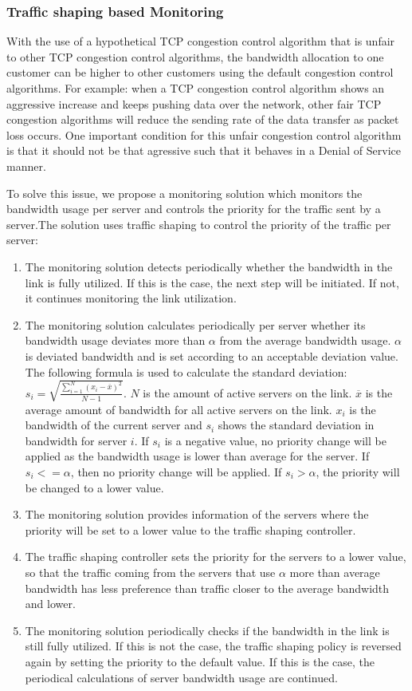 \documentclass{article}
\begin{document}
\subsubsection{Traffic shaping based Monitoring}
With the use of a hypothetical TCP congestion control algorithm that is unfair to other TCP congestion control algorithms, the bandwidth allocation to one customer can be higher to other customers using the default congestion control algorithms. For example: when a TCP congestion control algorithm shows an aggressive increase and keeps pushing data over the network, other fair TCP congestion algorithms will reduce the sending rate of the data transfer as packet loss occurs. One important condition for this unfair congestion control algorithm is that it should not be that agressive such that it behaves in a Denial of Service manner.

To solve this issue, we propose a monitoring solution which monitors the bandwidth usage per server and controls the priority for the traffic sent by a server.The solution uses traffic shaping to control the priority of the traffic per server:
\begin{enumerate}
	\item The monitoring solution detects periodically whether the bandwidth in the link is fully utilized. If this is the case, the next step will be initiated. If not, it continues monitoring the link utilization.
	\item The monitoring solution calculates periodically per server whether its bandwidth usage deviates more than $\alpha$ from the average bandwidth usage. $\alpha$ is deviated bandwidth and is set according to an acceptable deviation value. The following formula is used to calculate the standard deviation: $s_{i} = \sqrt{\frac{\sum_{i=1}^N (x_i - \overline{x})^2}{N-1} }$. $N$ is the amount of active servers on the link. $\overline{x}$ is the average amount of bandwidth for all active servers on the link. $x_i$ is the bandwidth of the current server and $s_{i}$ shows the standard deviation in bandwidth for server $i$. If $s_{i}$ is a negative value, no priority change will be applied as the bandwidth usage is lower than average for the server. If $s_{i} <= \alpha$, then no priority change will be applied. If $s_{i} > \alpha$, the priority will be changed to a lower value.
	\item The monitoring solution provides information of the servers where the priority will be set to a lower value to the traffic shaping controller.
	\item The traffic shaping controller sets the priority for the servers to a lower value, so that the traffic coming from the servers that use $\alpha$ more than average bandwidth has less preference than traffic closer to the average bandwidth and lower.
	\item The monitoring solution periodically checks if the bandwidth in the link is still fully utilized. If this is not the case, the traffic shaping policy is reversed again by setting the priority to the default value. If this is the case, the periodical calculations of server bandwidth usage are continued.
\end{enumerate}
\end{document}
